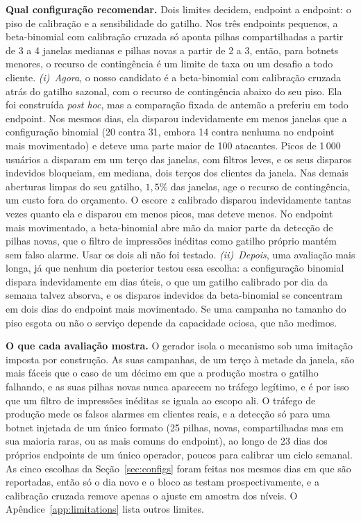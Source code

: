 \documentclass[conference,letterpaper,10pt]{IEEEtran}
\newcommand\1{\textit{(i)}}
\newcommand\2{\textit{(ii)}}
\newcommand\3{\textit{(iii)}}
\begin{document}
\textbf{Qual configuração recomendar.} Dois limites decidem, endpoint a endpoint: o piso de calibração e a sensibilidade do gatilho. Nos três endpoints pequenos, a beta-binomial com calibração cruzada só aponta pilhas compartilhadas a partir de 3 a 4 janelas medianas e pilhas novas a partir de 2 a 3, então, para botnets menores, o recurso de contingência é um limite de taxa ou um desafio a todo cliente. \1~\textit{Agora}, o nosso candidato é a beta-binomial com calibração cruzada atrás do gatilho sazonal, com o recurso de contingência abaixo do seu piso. Ela foi construída \textit{post hoc}, mas a comparação fixada de antemão a preferiu em todo endpoint. Nos mesmos dias, ela disparou indevidamente em menos janelas que a configuração binomial (20 contra 31, embora 14 contra nenhuma no endpoint mais movimentado) e deteve uma parte maior de 100 atacantes. Picos de 1\,000 usuários a disparam em um terço das janelas, com filtros leves, e os seus disparos indevidos bloqueiam, em mediana, dois terços dos clientes da janela. Nas demais aberturas limpas do seu gatilho, $1{,}5\%$ das janelas, age o recurso de contingência, um custo fora do orçamento. O escore $z$ calibrado disparou indevidamente tantas vezes quanto ela e disparou em menos picos, mas deteve menos. No endpoint mais movimentado, a beta-binomial abre mão da maior parte da detecção de pilhas novas, que o filtro de impressões inéditas como gatilho próprio mantém sem falso alarme. Usar os dois ali não foi testado. \2~\textit{Depois}, uma avaliação mais longa, já que nenhum dia posterior testou essa escolha: a configuração binomial dispara indevidamente em dias úteis, o que um gatilho calibrado por dia da semana talvez absorva, e os disparos indevidos da beta-binomial se concentram em dois dias do endpoint mais movimentado. Se uma campanha no tamanho do piso esgota ou não o serviço depende da capacidade ociosa, que não medimos.

\textbf{O que cada avaliação mostra.} O gerador isola o mecanismo sob uma imitação imposta por construção. As suas campanhas, de um terço à metade da janela, são mais fáceis que o caso de um décimo em que a produção mostra o gatilho falhando, e as suas pilhas novas nunca aparecem no tráfego legítimo, e é por isso que um filtro de impressões inéditas se iguala ao escopo ali. O tráfego de produção mede os falsos alarmes em clientes reais, e a detecção só para uma botnet injetada de um único formato (25 pilhas, novas, compartilhadas mas em sua maioria raras, ou as mais comuns do endpoint), ao longo de 23 dias dos próprios endpoints de um único operador, poucos para calibrar um ciclo semanal. As cinco escolhas da Seção~\ref{sec:configs} foram feitas nos mesmos dias em que são reportadas, então só o dia novo e o bloco as testam prospectivamente, e a calibração cruzada remove apenas o ajuste em amostra dos níveis. O Apêndice~\ref{app:limitations} lista outros limites.
\end{document}
